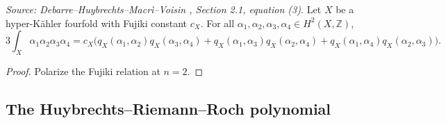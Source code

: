 \begin{lemma}
  \label{lem:fujiki-fourfold}
  \textit{Source: Debarre--Huybrechts--Macr\`i--Voisin \cite{MR4654610}, Section 2.1, equation (3).}
  Let \(X\) be a hyper-K\"ahler fourfold with Fujiki constant \(c_X\).  For all
  \(\alpha_1, \alpha_2, \alpha_3, \alpha_4 \in H^2(X, \mathbb{Z})\),
  \[
    3\int_X \alpha_1 \alpha_2 \alpha_3 \alpha_4
    = c_X\bigl(
      q_X(\alpha_1,\alpha_2)q_X(\alpha_3,\alpha_4)
      + q_X(\alpha_1,\alpha_3)q_X(\alpha_2,\alpha_4)
      + q_X(\alpha_1,\alpha_4)q_X(\alpha_2,\alpha_3)
    \bigr).
  \]
\end{lemma}

\begin{proof}
  Polarize the Fujiki relation at \(n = 2\).
\end{proof}

\subsection{The Huybrechts--Riemann--Roch polynomial}

